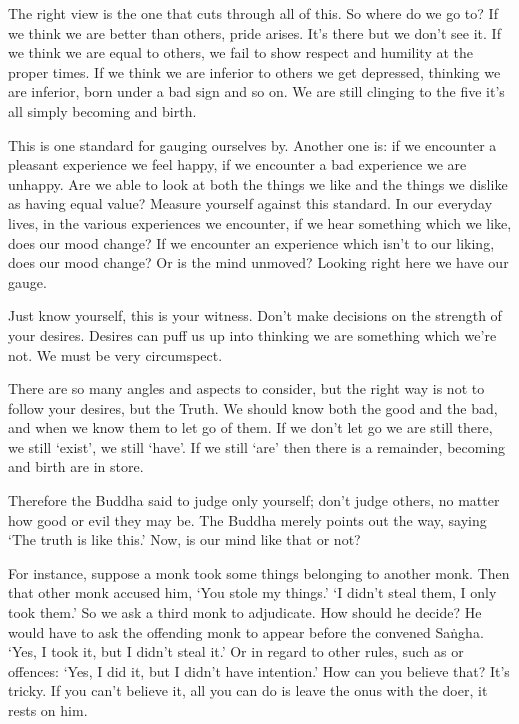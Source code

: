 The right view is the one that cuts through all of this. So where do we go to? If we think we are better than others, pride arises.
It's there but we don't see it. If we think we are equal to others, we fail to show respect and humility at the proper times. If we think we are inferior to others we get depressed, thinking we are inferior, born under a bad sign and so on. We are still clinging to the five  it's all simply becoming and birth. 

This is one standard for gauging ourselves by. Another one is: if we encounter a pleasant experience we feel happy, if we encounter a bad experience we are unhappy. Are we able to look at both the things we like and the things we dislike as having equal value? Measure yourself against this standard. In our everyday lives, in the various experiences we encounter, if we hear something which we like, does our mood change? If we encounter an experience which isn't to our liking, does our mood change? Or is the mind unmoved? Looking right here we have our gauge. 

Just know yourself, this is your witness. Don't make decisions on the strength of your desires. Desires can puff us up into thinking we are something which we're not. We must be very circumspect. 

There are so many angles and aspects to consider, but the right way is not to follow your desires, but the Truth. We should know both the good and the bad, and when we know them to let go of them. If we don't let go we are still there, we still `exist', we still `have'. If we still `are'
then there is a remainder, becoming and birth are in store. 

Therefore the Buddha said to judge only yourself; don't judge others, no matter how good or evil they may be. The Buddha merely points out the way, saying `The truth is like this.' Now, is our mind like that or not? 

For instance, suppose a monk took some things belonging to another monk. Then that other monk accused him, `You stole my things.' `I didn't steal them, I only took them.' So we ask a third monk to adjudicate. How should he decide? He would have to ask the offending monk to appear before the convened Sa\.ngha. `Yes, I took it, but I didn't steal it.' Or in regard to other rules, such as  or  offences: `Yes, I did it, but I didn't have intention.' How can you believe that? It's tricky. If you can't believe it, all you can do is leave the onus with the doer, it rests on him. 

